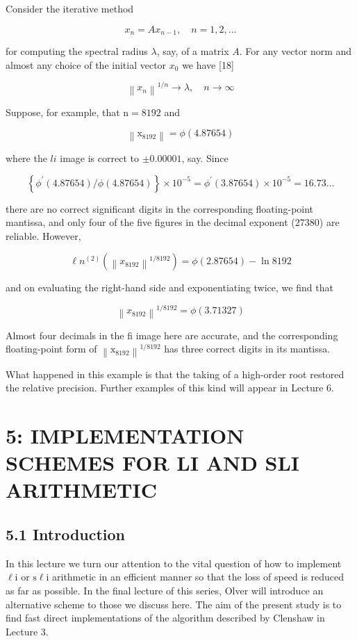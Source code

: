 \documentclass[10pt]{article}
\begin{document}
Consider the iterative method

$$
x_{n}=A x_{n-1}, \quad n=1,2, \ldots
$$

for computing the spectral radius $\lambda$, say, of a matrix $A$. For any vector norm and almost any choice of the initial vector $x_{0}$ we have [18]

$$
\left\|x_{n}\right\|^{1 / n} \rightarrow \lambda, \quad n \rightarrow \infty
$$

Suppose, for example, that $\mathrm{n}=8192$ and

$$
\left\|\mathrm{x}_{8192}\right\|=\phi(4.87654)
$$

where the $l i$ image is correct to $\pm 0.00001$, say. Since

$$
\left\{\phi^{\prime}(4.87654) / \phi(4.87654)\right\} \times 10^{-5}=\phi^{\prime}(3.87654) \times 10^{-5}=16.73 \ldots
$$

there are no correct significant digits in the corresponding floating-point mantissa, and only four of the five figures in the decimal exponent (27380) are reliable. However,

$$
\ell n^{(2)}\left(\left\|x_{8192}\right\|^{1 / 8192}\right)=\phi(2.87654)-\ln 8192
$$

and on evaluating the right-hand side and exponentiating twice, we find that

$$
\left\|x_{8192}\right\|^{1 / 8192}=\phi(3.71327)
$$

Almost four decimals in the fi image here are accurate, and the corresponding floating-point form of $\left\|\mathrm{x}_{8192}\right\|^{1 / 8192}$ has three correct digits in its mantissa.

What happened in this example is that the taking of a high-order root restored the relative precision. Further examples of this kind will appear in Lecture 6.

\section*{5: IMPLEMENTATION SCHEMES FOR LI AND SLI ARITHMETIC}


\subsection*{5.1 Introduction}
In this lecture we turn our attention to the vital question of how to implement $\ell \mathrm{i}$ or $\mathrm{s} \ell \mathrm{i}$ arithmetic in an efficient manner so that the loss of speed is reduced as far as possible. In the final lecture of this series, Olver will introduce an alternative scheme to those we discuss here. The aim of the present study is to find fast direct implementations of the algorithm described by Clenshaw in Lecture 3.
\end{document}
